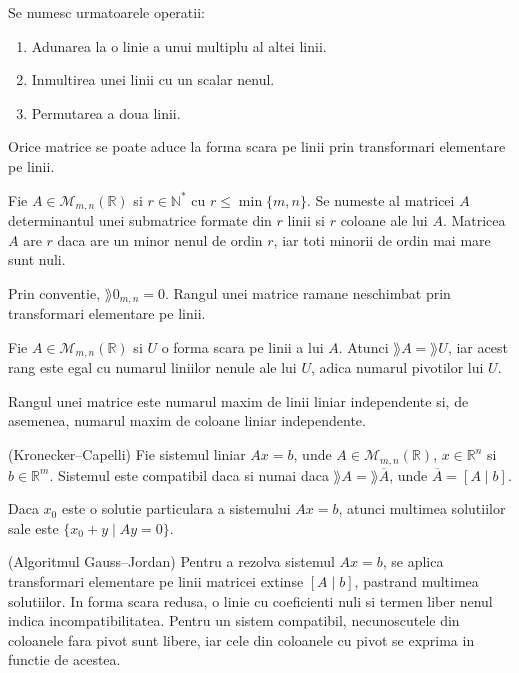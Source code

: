 \documentclass{article}
\begin{document}
\begin{enumerate}
  \begin{tcolorbox}
     Se numesc  urmatoarele operatii:
    \begin{enumerate}
      \item Adunarea la o linie a unui multiplu al altei linii.
      \item Inmultirea unei linii cu un scalar nenul.
      \item Permutarea a doua linii.
    \end{enumerate}
  \end{tcolorbox}

  \observatie Orice matrice se poate aduce la forma scara pe linii prin transformari elementare pe linii.

   Fie $A \in \mathcal{M}_{m,n}(\mathbb{R})$ si $r \in \mathbb{N}^*$ cu $r \leq \min\{m,n\}$. Se numeste  al matricei $A$ determinantul unei submatrice formate din $r$ linii si $r$ coloane ale lui $A$. Matricea $A$ are  $r$ daca are un minor nenul de ordin $r$, iar toti minorii de ordin mai mare sunt nuli.

  \observatie Prin conventie, $\rang 0_{m,n} = 0$. Rangul unei matrice ramane neschimbat prin transformari elementare pe linii.

  \corolar Fie $A \in \mathcal{M}_{m,n}(\mathbb{R})$ si $U$ o forma scara pe linii a lui $A$. Atunci $\rang A = \rang U$, iar acest rang este egal cu numarul liniilor nenule ale lui $U$, adica numarul pivotilor lui $U$.

  \observatie Rangul unei matrice este numarul maxim de linii liniar independente si, de asemenea, numarul maxim de coloane liniar independente.

  \begin{tcolorbox}
    \teorema (Kronecker--Capelli) Fie sistemul liniar $Ax = b$, unde $A \in \mathcal{M}_{m,n}(\mathbb{R})$, $x \in \mathbb{R}^n$ si $b \in \mathbb{R}^m$. Sistemul este compatibil daca si numai daca $\rang A = \rang \overline{A}$, unde $\overline{A} = [A \mid b]$.
  \end{tcolorbox}

  \propozitie Daca $x_0$ este o solutie particulara a sistemului $Ax=b$, atunci multimea solutiilor sale este $\{x_0+y \mid Ay=0\}$.

  \begin{tcolorbox}
    \observatie (Algoritmul Gauss--Jordan) Pentru a rezolva sistemul $Ax=b$, se aplica transformari elementare pe linii matricei extinse $[A \mid b]$, pastrand multimea solutiilor. In forma scara redusa, o linie cu coeficienti nuli si termen liber nenul indica incompatibilitatea. Pentru un sistem compatibil, necunoscutele din coloanele fara pivot sunt libere, iar cele din coloanele cu pivot se exprima in functie de acestea.


\end{tcolorbox}
\end{enumerate}
\end{document}
